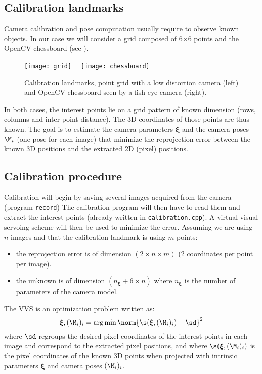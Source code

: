 \documentclass{ecnreport}
\begin{document}
\subsection{Calibration landmarks}

Camera calibration and pose computation usually require to observe known objects. In our case we will consider a grid composed of 6$\times$6 points and
the OpenCV chessboard (see ).

\begin{figure}[h!]
 \texttt{[image: grid]} ~~\texttt{[image: chessboard]}
 \caption{Calibration landmarks, point grid with a low distortion camera (left) and OpenCV chessboard seen by a fish-eye camera (right).}
 \label{fig:landmarks}
\end{figure}

\newcommand{\xii}{{\boldsymbol{\xi}}}

In both cases, the interest points lie on a grid pattern of known dimension (rows, columns and inter-point distance). The 3D coordinates of those points
are thus known. The goal is to estimate the camera parameters $\xii$ and the camera poses $\M_i$ (one pose for each image) that minimize the reprojection error between the known 3D positions
and the extracted 2D (pixel) positions.

\subsection{Calibration procedure}
\label{sec:calib}

Calibration will begin by saving several images acquired from the camera (program \texttt{record}) The calibration program will then have to read them and extract the interest
points (already written in \texttt{calibration.cpp}). A virtual visual servoing scheme will then be used to minimize the error.
Assuming we are using $n$ images and that the calibration landmark is using $m$ points:
\begin{itemize}
 \item the reprojection error is of dimension $(2\times n\times m)$ (2 coordinates per point per image).
 \item the unknown is of dimension $(n_\xii + 6\times n)$ where $n_\xii$ is the number of parameters of the camera model.
\end{itemize}
The VVS is an optimization problem written as:
\begin{equation}\label{eq:calib}
 \xii, (\M_i)_i = \arg\min \norm{\s(\xii, (\M_i)_i) - \sd}^2
\end{equation}
where $\sd$ regroups the desired pixel coordinates of the interest points in each image and correspond to the extracted pixel positions, 
and where $\s(\xii, (\M_i)_i)$ is the pixel coordinates of the known 3D points when projected with intrinsic parameters $\xii$ and camera poses $(\M_i)_i$.
\end{document}
